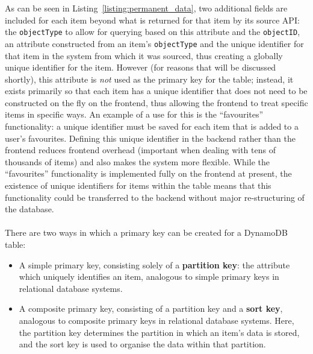 \documentclass[a4paper,11pt]{report}
\begin{document}
As can be seen in Listing~\ref{listing:permanent_data}, two additional fields are included for each item beyond what is returned for that item by its source API:
the \verb|objectType| to allow for querying based on this attribute and the \verb|objectID|, an attribute constructed from an item's \verb|objectType| and the unique identifier for that item in the system from which it was sourced, thus creating a globally unique identifier for the item.
However (for reasons that will be discussed shortly), this attribute is \textit{not} used as the primary key for the table;
instead, it exists primarily so that each item has a unique identifier that does not need to be constructed on the fly on the frontend, thus allowing the frontend to treat specific items in specific ways.
An example of a use for this is the ``favourites'' functionality: a unique identifier must be saved for each item that is added to a user's favourites.
Defining this unique identifier in the backend rather than the frontend reduces frontend overhead (important when dealing with tens of thousands of items) and also makes the system more flexible.
While the ``favourites'' functionality is implemented fully on the frontend at present, the existence of unique identifiers for items within the table means that this functionality could be transferred to the backend without major re-structuring of the database.
\\\\
There are two ways in which a primary key can be created for a DynamoDB table\supercite{choosing-the-right-key}:
\begin{itemize}
    \item   A simple primary key, consisting solely of a \textbf{partition key}: the attribute which uniquely identifies an item, analogous to simple primary keys in relational database systems.

    \item   A composite primary key, consisting of a partition key and a \textbf{sort key}, analogous to composite primary keys in relational database systems.
            Here, the partition key determines the partition in which an item's data is stored, and the sort key is used to organise the data within that partition.
\end{itemize}
\end{document}
